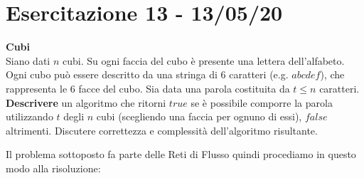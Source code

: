 \documentclass[../cheatSheetAlgoritmi.tex]{subfiles}
\begin{document}
\section{Esercitazione 13 - 13/05/20}
\textbf{Cubi} \\
Siano dati $n$ cubi. Su ogni faccia del cubo è presente una lettera dell'alfabeto. Ogni cubo può essere descritto da una stringa di $6$ caratteri (e.g. $abcdef$), che rappresenta le 6 facce del cubo. Sia data una parola costituita da $t \leq n$ caratteri. \textbf{Descrivere} un algoritmo che ritorni $true$ se è possibile comporre la parola utilizzando $t$ degli $n$ cubi (scegliendo una faccia per ognuno di essi), $false$ altrimenti. Discutere correttezza e complessità dell'algoritmo risultante.

Il problema sottoposto fa parte delle Reti di Flusso quindi procediamo in questo modo alla \hfill \break risoluzione:
\end{document}
